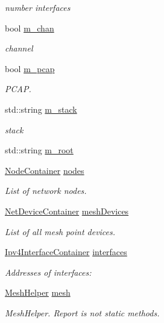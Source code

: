 \begin{DoxyCompactItemize}
\begin{DoxyCompactList}\small\item\em number interfaces \end{DoxyCompactList}\item 
bool \hyperlink{classMeshTest_ad0d36545a05da5c3139efffbe973a636}{m\+\_\+chan}
\begin{DoxyCompactList}\small\item\em channel \end{DoxyCompactList}\item 
bool \hyperlink{classMeshTest_a2bafad3263f4c6d2f72d0340699d4cc3}{m\+\_\+pcap}
\begin{DoxyCompactList}\small\item\em P\+C\+AP. \end{DoxyCompactList}\item 
std\+::string \hyperlink{classMeshTest_a4c4cafe981814fd09018ab2895fbdf79}{m\+\_\+stack}
\begin{DoxyCompactList}\small\item\em stack \end{DoxyCompactList}\item 
std\+::string \hyperlink{classMeshTest_a05b574488e719d40c056938a22028073}{m\+\_\+root}
\item 
\hyperlink{classns3_1_1NodeContainer}{Node\+Container} \hyperlink{classMeshTest_a54656819cec120391cb9cef19fb1c47a}{nodes}
\begin{DoxyCompactList}\small\item\em List of network nodes. \end{DoxyCompactList}\item 
\hyperlink{classns3_1_1NetDeviceContainer}{Net\+Device\+Container} \hyperlink{classMeshTest_acd25a9d6c8182d166904467148e55445}{mesh\+Devices}
\begin{DoxyCompactList}\small\item\em List of all mesh point devices. \end{DoxyCompactList}\item 
\hyperlink{classns3_1_1Ipv4InterfaceContainer}{Ipv4\+Interface\+Container} \hyperlink{classMeshTest_a5dc8fc0fede852feb6bf27788e8f19ee}{interfaces}
\begin{DoxyCompactList}\small\item\em Addresses of interfaces\+: \end{DoxyCompactList}\item 
\hyperlink{classns3_1_1MeshHelper}{Mesh\+Helper} \hyperlink{classMeshTest_aeca44e9e9db40bd844a65586028fd053}{mesh}
\begin{DoxyCompactList}\small\item\em Mesh\+Helper. Report is not static methods. \end{DoxyCompactList}\end{DoxyCompactItemize}


